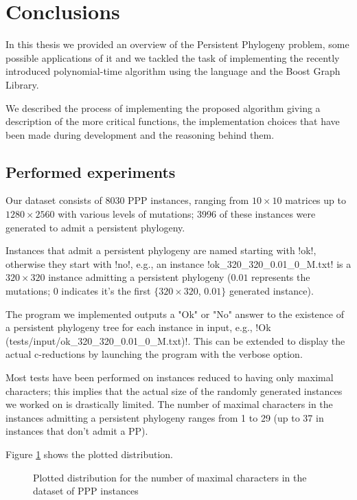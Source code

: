 
\section{Conclusions}\label{section:conclusions}

In this thesis we provided an overview of the Persistent Phylogeny problem, some possible applications of it and we tackled the task of implementing the recently introduced polynomial-time algorithm \cite{PPPptime2016} using the \cc{} language and the Boost Graph Library.

We described the process of implementing the proposed algorithm giving a description of the more critical functions, the implementation choices that have been made during development and the reasoning behind them.

\subsection{Performed experiments}\label{section:experiments}

Our dataset consists of 8030 PPP instances, ranging from $10 \times 10$ matrices up to $1280 \times 2560$ with various levels of mutations; 3996 of these instances were generated to admit a persistent phylogeny.

Instances that admit a persistent phylogeny are named starting with !ok!, otherwise they start with !no!, e.g., an instance !ok_320_320_0.01_0_M.txt! is a $320 \times 320$ instance admitting a persistent phylogeny ($0.01$ represents the mutations; $0$ indicates it's the first $\{ 320 \times 320$, $0.01 \}$ generated instance).

The program we implemented outputs a "Ok" or "No" answer to the existence of a persistent phylogeny tree for each instance in input, e.g., !Ok (tests/input/ok_320_320_0.01_0_M.txt)!.
This can be extended to display the actual c-reductions by launching the program with the verbose option.

Most tests have been performed on instances reduced to having only maximal characters; this implies that the actual size of the randomly generated instances we worked on is drastically limited.
The number of maximal characters in the instances admitting a persistent phylogeny ranges from 1 to 29 (up to 37 in instances that don't admit a PP).

Figure \ref{figure:6} shows the plotted distribution.

\begin{figure}[hp]
  

  \caption{Plotted distribution for the number of maximal characters in the dataset of PPP instances}\label{figure:6}
\end{figure}

